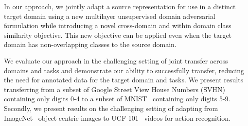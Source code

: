 In our approach, we jointly adapt a source representation for use in a distinct target domain using a new multilayer unsupervised domain adversarial formulation while introducing a novel cross-domain and within domain class similarity objective. This new objective can be applied even when the target domain has non-overlapping classes to the source domain. 

We evaluate our approach in the challenging setting of joint transfer across domains and tasks and demonstrate our ability to successfully transfer, reducing the need for annotated data for the target domain and tasks. 
We present results transferring from a subset of Google Street View House Numbers (SVHN)~\cite{netzer2011reading} containing only digits 0-4 to  a subset of MNIST~\cite{lecun1998gradient} containing only digits 5-9.
Secondly, we present results on the challenging setting of adapting from ImageNet~\cite{imagenet_cvpr09} object-centric images to UCF-101~\cite{soomro2012ucf101} videos for action recognition. 

